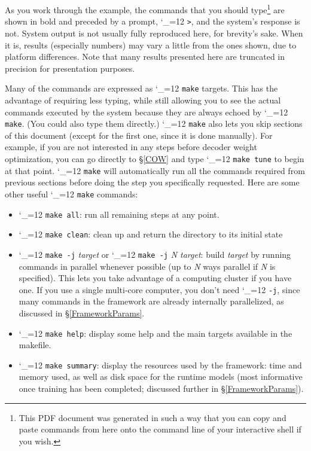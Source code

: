 \documentclass[11pt,letterpaper]{article}
\def\code{\begingroup\catcode`\_=12 \codex}
\newcommand{\codex}[1]{\texttt{#1}\endgroup}
\begin{document}
As you work through the example, the commands that you should type\footnote{This
   PDF document was generated in such a way that you can copy and paste commands
   from here onto the command line of your interactive shell if you wish.}
are shown in bold and preceded by a prompt, \code{>}, and the system's response
is not.  System output is not usually fully reproduced here, for brevity's
sake. When it is, results (especially numbers) may vary a little from the ones
shown, due to platform differences. Note that many results presented here are
truncated in precision for presentation purposes.

Many of the commands are expressed as \code{make} targets. This has the
advantage of requiring less typing, while still allowing you to see the actual
commands executed by the system because they are always echoed by \code{make}.
(You could also type them directly.) \code{make} also lets you skip
sections of this document (except for the first one, since it is done
manually). For example, if you are not interested in any steps before decoder
weight optimization, you can go directly to \S\ref{COW} and type
\code{make tune} to begin at that point. \code{make} will automatically run all
the commands required from previous sections before doing the step you
specifically requested. Here are some other useful \code{make} commands:
\begin{itemize}
\item \code{make all}: run all remaining steps at any point.
\item \code{make clean}: clean up and return the directory to its initial state
\item \code{make -j} \emph{target} or \code{make -j} \emph{N target}: build
      \emph{target} by running commands in parallel whenever possible (up to
      \emph{N} ways parallel if \emph{N} is specified). This lets you take
      advantage of a computing cluster if you have one. If you use a single
      multi-core computer, you don't need \code{-j}, since many commands in the
      framework are already internally parallelized, as discussed in
      \S\ref{FrameworkParams}.
\item \code{make help}: display some help and the main targets available in
      the makefile.
\item \code{make summary}: display the resources used by the framework: time
      and memory used, as well as disk space for the runtime models (most
      informative once training has been completed; discussed further in
      \S\ref{FrameworkParams}).
\end{itemize}
\end{document}
